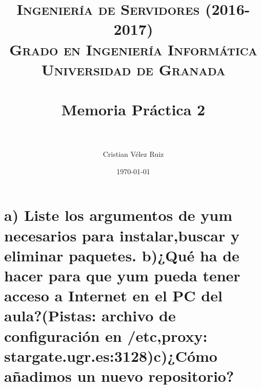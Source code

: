


\title{	
\normalfont \normalsize 
\textsc{\textbf{Ingeniería de Servidores (2016-2017)} \\ Grado en Ingeniería Informática \\ Universidad de Granada} \\ [25pt] %
\horrule{0.5pt} \\[0.4cm] %
\huge Memoria Práctica 2 \\ %
\horrule{2pt} \\[0.5cm] %
}

\author{Cristian Vélez Ruiz} %

\date{\normalsize\today} %



\maketitle %

\newpage %

\tableofcontents %

\listoffigures

\listoftables

\newpage

\section[Cuestión 1]{a) Liste los argumentos de yum necesarios para instalar,buscar y eliminar paquetes. b)¿Qué ha de hacer para que yum pueda tener acceso a Internet en el PC del aula?(Pistas: archivo de configuración en /etc,proxy: stargate.ugr.es:3128)c)¿Cómo añadimos un nuevo repositorio?}



